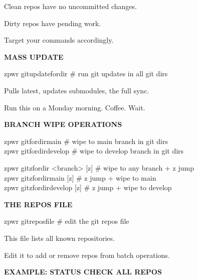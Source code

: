 \documentclass[11pt,a4paper,twoside]{book}
\begin{document}
Clean repos have no uncommitted changes.

Dirty repos have pending work.

Target your commands accordingly.


\vspace{12pt}
{\bfseries\color{neonyellow} MASS UPDATE}\vspace{4pt}

\begin{codebox}
zpwr gitupdatefordir      \# run git updates in all git dirs\\
\end{codebox}

Pulls latest, updates submodules, the full sync.

Run this on a Monday morning. Coffee. Wait.


\vspace{12pt}
{\bfseries\color{neonyellow} BRANCH WIPE OPERATIONS}\vspace{4pt}

\begin{codebox}
zpwr gitfordirmain        \# wipe to main branch in git dirs\\
zpwr gitfordirdevelop     \# wipe to develop branch in git dirs\\
\end{codebox}

\begin{codebox}
zpwr gitzfordir <branch> [z]       \# wipe to any branch + z jump\\
zpwr gitzfordirmain [z]            \# z jump + wipe to main\\
zpwr gitzfordirdevelop [z]         \# z jump + wipe to develop\\
\end{codebox}


\vspace{12pt}
{\bfseries\color{neonyellow} THE REPOS FILE}\vspace{4pt}

\begin{codebox}
zpwr gitreposfile         \# edit the git repos file\\
\end{codebox}

This file lists all known repositories.

Edit it to add or remove repos from batch operations.


\vspace{12pt}
{\bfseries\color{neonyellow} EXAMPLE: STATUS CHECK ALL REPOS}\vspace{4pt}
\end{document}
